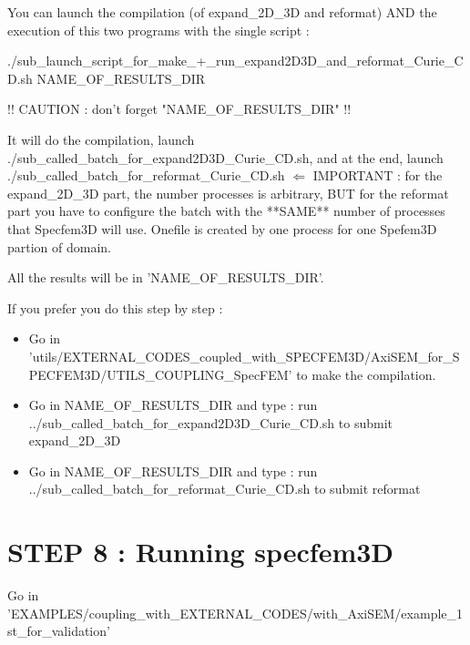 \documentclass[11pt]{article}
\begin{document}
\medskip

\noindent You can launch the compilation (of expand\_2D\_3D and reformat) AND the execution of this two programs with the single script :

\smallskip

\noindent ./sub\_launch\_script\_for\_make\_+\_run\_expand2D3D\_and\_reformat\_Curie\_CD.sh NAME\_OF\_RESULTS\_DIR

\medskip

\noindent !! CAUTION : don't forget "NAME\_OF\_RESULTS\_DIR" !!

\medskip

\noindent It will do the compilation, launch ./sub\_called\_batch\_for\_expand2D3D\_Curie\_CD.sh, and at the end, launch ./sub\_called\_batch\_for\_reformat\_Curie\_CD.sh $\Longleftarrow$ IMPORTANT : for the expand\_2D\_3D part, the number processes is arbitrary, BUT for the reformat part you have to configure the batch with the **SAME** number of processes that Specfem3D will use. Onefile is created by one process for one Spefem3D partion of domain.

\smallskip

\noindent All the results will be in 'NAME\_OF\_RESULTS\_DIR'.

\bigskip

\noindent If you prefer you do this step by step :

\begin{itemize}

\item[\textbullet] Go in {\scriptsize 'utils/EXTERNAL\_CODES\_coupled\_with\_SPECFEM3D/AxiSEM\_for\_SPECFEM3D/UTILS\_COUPLING\_SpecFEM'} to make the compilation.
\item[\textbullet] Go in NAME\_OF\_RESULTS\_DIR and type : run ../sub\_called\_batch\_for\_expand2D3D\_Curie\_CD.sh to submit expand\_2D\_3D
\item[\textbullet] Go in NAME\_OF\_RESULTS\_DIR and type : run ../sub\_called\_batch\_for\_reformat\_Curie\_CD.sh to submit reformat

\end{itemize}

\section{STEP 8 : Running specfem3D}

\noindent Go in 'EXAMPLES/coupling\_with\_EXTERNAL\_CODES/with\_AxiSEM/example\_1st\_for\_validation'
\end{document}
